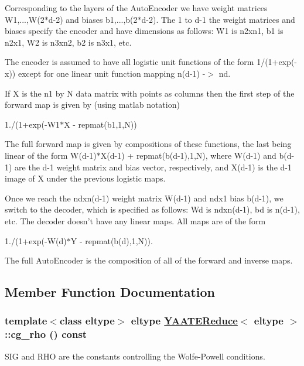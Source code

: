 Corresponding to the layers of the Auto\-Encoder we have weight matrices W1,...,W(2$\ast$d-2) and biases b1,...,b(2$\ast$d-2). The 1 to d-1 the weight matrices and biases specify the encoder and have dimensions as follows: W1 is n2xn1, b1 is n2x1, W2 is n3xn2, b2 is n3x1, etc.

The encoder is assumed to have all logistic unit functions of the form 1/(1+exp(-x)) except for one linear unit function mapping n(d-1) -$>$ nd.

If X is the n1 by N data matrix with points as columns then the first step of the forward map is given by (using matlab notation)

1./(1+exp(-W1$\ast$X - repmat(b1,1,N))

The full forward map is given by compositions of these functions, the last being linear of the form W(d-1)$\ast$X(d-1) + repmat(b(d-1),1,N), where W(d-1) and b(d-1) are the d-1 weight matrix and bias vector, respectively, and X(d-1) is the d-1 image of X under the previous logistic maps.

Once we reach the ndxn(d-1) weight matrix W(d-1) and ndx1 bias b(d-1), we switch to the decoder, which is specified as follows: Wd is ndxn(d-1), bd is n(d-1), etc. The decoder doesn't have any linear maps. All maps are of the form

1./(1+exp(-W(d)$\ast$Y - repmat(b(d),1,N)).

The full Auto\-Encoder is the composition of all of the forward and inverse maps. 



\subsection{Member Function Documentation}
\hypertarget{class_y_a_a_t_e_reduce_a39}{
\subsubsection[cg\_\-rho]{\setlength{\rightskip}{0pt plus 5cm}template$<$class eltype$>$ eltype \hyperlink{class_y_a_a_t_e_reduce}{YAATEReduce}$<$ eltype $>$::cg\_\-rho () const}}
\label{class_y_a_a_t_e_reduce_a39}


SIG and RHO are the constants controlling the Wolfe-Powell conditions. 

